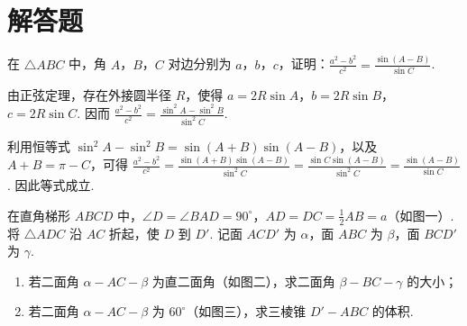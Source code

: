 \section{解答题}
\begin{problem}
在 \(\triangle ABC\) 中，角 \(A\)，\(B\)，\(C\) 对边分别为 \(a\)，\(b\)，\(c\)，证明：\(\frac{a^{2}-b^{2}}{c^{2}}=\frac{\sin\left(A-B\right)}{\sin C}\).
\end{problem}

\begin{solution}
由正弦定理，存在外接圆半径 \(R\)，使得 \(a=2R\sin A\)，\(b=2R\sin B\)，\(c=2R\sin C\). 因而 \(\frac{a^{2}-b^{2}}{c^{2}}=\frac{\sin^{2}A-\sin^{2}B}{\sin^{2}C}\).

利用恒等式 \(\sin^{2}A-\sin^{2}B=\sin(A+B)\sin(A-B)\)，以及 \(A+B=\pi-C\)，可得 \(\frac{a^{2}-b^{2}}{c^{2}}=\frac{\sin(A+B)\sin(A-B)}{\sin^{2}C}=\frac{\sin C\sin(A-B)}{\sin^{2}C}=\frac{\sin(A-B)}{\sin C}\).
因此等式成立.
\end{solution}

\begin{problem}
在直角梯形 \(ABCD\) 中，\(\angle D=\angle BAD=90^{\circ}\)，\(AD=DC=\frac{1}{2}AB=a\)（如图一）. 将 \(\triangle ADC\) 沿 \(AC\) 折起，使 \(D\) 到 \(D'\). 记面 \(ACD'\) 为 \(\alpha\)，面 \(ABC\) 为 \(\beta\)，面 \(BCD'\) 为 \(\gamma\).

\begin{enumerate}
\item 若二面角 \(\alpha-AC-\beta\) 为直二面角（如图二），求二面角 \(\beta-BC-\gamma\) 的大小；
\item 若二面角 \(\alpha-AC-\beta\) 为 \(60^{\circ}\)（如图三），求三棱锥 \(D'-ABC\) 的体积.
\end{enumerate}

\end{problem}

